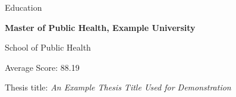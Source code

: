 \begin{rubric}{Education}

\entry*[2023 -- present]%
	\textbf{Master of Public Health, Example University}
    \par School of Public Health
    \par Average Score: 88.19
    \par Thesis title: \emph{An Example Thesis Title Used for Demonstration}
%
\end{rubric}

